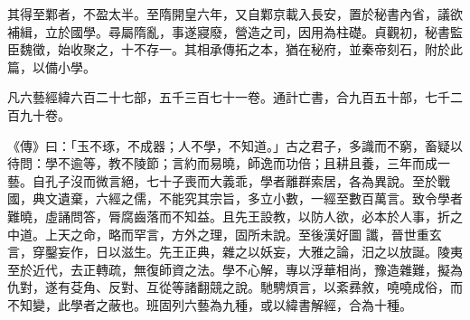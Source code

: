 \begin{pinyinscope}
 其得至鄴者，不盈太半。至隋開皇六年，又自鄴京載入長安，置於秘書內省，議欲補緝，立於國學。尋屬隋亂，事遂寢廢，營造之司，因用為柱礎。貞觀初，秘書監臣魏徵，始收聚之，十不存一。其相承傳拓之本，猶在秘府，並秦帝刻石，附於此篇，以備小學。



 凡六藝經緯六百二十七部，五千三百七十一卷。通計亡書，合九百五十部，七千二百九十卷。



 《傳》曰：「玉不琢，不成器；人不學，不知道。」古之君子，多識而不窮，畜疑以待問：學不逾等，教不陵節；言約而易曉，師逸而功倍；且耕且養，三年而成一藝。自孔子沒而微言絕，七十子喪而大義乖，學者離群索居，各為異說。至於戰國，典文遺棄，六經之儒，不能究其宗旨，多立小數，一經至數百萬言。致令學者難曉，虛誦問答，脣腐齒落而不知益。且先王設教，以防人欲，必本於人事，折之中道。上天之命，略而罕言，方外之理，固所未說。至後漢好圖
 讖，晉世重玄言，穿鑿妄作，日以滋生。先王正典，雜之以妖妄，大雅之論，汨之以放誕。陵夷至於近代，去正轉疏，無復師資之法。學不心解，專以浮華相尚，豫造雜難，擬為仇對，遂有芟角、反對、互從等諸翻競之說。馳騁煩言，以紊彞敘，嘵嘵成俗，而不知變，此學者之蔽也。班固列六藝為九種，或以緯書解經，合為十種。



\end{pinyinscope}